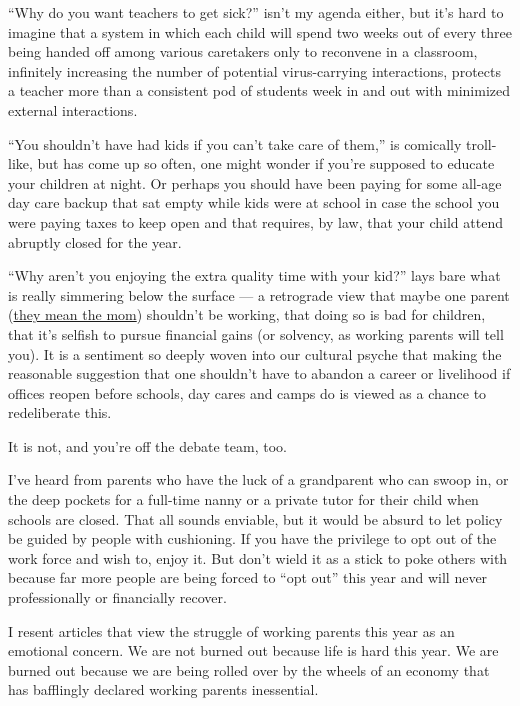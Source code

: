 ``Why do you want teachers to get sick?'' isn't my agenda either, but
it's hard to imagine that a system in which each child will spend two
weeks out of every three being handed off among various caretakers only
to reconvene in a classroom, infinitely increasing the number of
potential virus-carrying interactions, protects a teacher more than a
consistent pod of students week in and out with minimized external
interactions.

``You shouldn't have had kids if you can't take care of them,'' is
comically troll-like, but has come up so often, one might wonder if
you're supposed to educate your children at night. Or perhaps you should
have been paying for some all-age day care backup that sat empty while
kids were at school in case the school you were paying taxes to keep
open and that requires, by law, that your child attend abruptly closed
for the year.

``Why aren't you enjoying the extra quality time with your kid?'' lays
bare what is really simmering below the surface --- a retrograde view
that maybe one parent
(\href{https://www.nytimes3xbfgragh.onion/2020/06/03/business/economy/coronavirus-working-women.html}{they
mean the mom}) shouldn't be working, that doing so is bad for children,
that it's selfish to pursue financial gains (or solvency, as working
parents will tell you). It is a sentiment so deeply woven into our
cultural psyche that making the reasonable suggestion that one shouldn't
have to abandon a career or livelihood if offices reopen before schools,
day cares and camps do is viewed as a chance to redeliberate this.

It is not, and you're off the debate team, too.

I've heard from parents who have the luck of a grandparent who can swoop
in, or the deep pockets for a full-time nanny or a private tutor for
their child when schools are closed. That all sounds enviable, but it
would be absurd to let policy be guided by people with cushioning. If
you have the privilege to opt out of the work force and wish to, enjoy
it. But don't wield it as a stick to poke others with because far more
people are being forced to ``opt out'' this year and will never
professionally or financially recover.

I resent articles that view the struggle of working parents this year as
an emotional concern. We are not burned out because life is hard this
year. We are burned out because we are being rolled over by the wheels
of an economy that has bafflingly declared working parents inessential.


